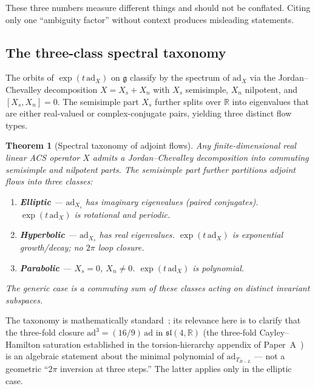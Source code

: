 \documentclass[11pt,a4paper]{article}
\theoremstyle{plain}
\newtheorem{theorem}{Theorem}[section]
\theoremstyle{definition}
\theoremstyle{remark}
\begin{document}
These three numbers measure different things and should not be
conflated.  Citing only one ``ambiguity factor'' without context
produces misleading statements.

\subsection{The three-class spectral taxonomy}
\label{sec:taxonomy}

The orbits of $\exp(t\,\mathrm{ad}_X)$ on $\mathfrak{g}$ classify by
the spectrum of $\mathrm{ad}_X$ via the Jordan--Chevalley decomposition
$X = X_s + X_n$ with $X_s$ semisimple, $X_n$ nilpotent, and
$[X_s, X_n] = 0$.  The semisimple part $X_s$ further splits over
$\mathbb{R}$ into eigenvalues that are either real-valued or
complex-conjugate pairs, yielding three distinct flow types.

\begin{theorem}[Spectral taxonomy of adjoint flows]\label{thm:taxonomy}
Any finite-dimensional real linear ACS operator $X$ admits a
Jordan--Chevalley decomposition into commuting semisimple and
nilpotent parts.  The semisimple part further partitions adjoint
flows into three classes:
\begin{enumerate}[label=(\roman*)]
  \item \textbf{Elliptic} --- $\mathrm{ad}_{X_s}$ has imaginary
    eigenvalues (paired conjugates).  $\exp(t\,\mathrm{ad}_X)$ is
    rotational and periodic.
  \item \textbf{Hyperbolic} --- $\mathrm{ad}_{X_s}$ has real eigenvalues.
    $\exp(t\,\mathrm{ad}_X)$ is exponential growth/decay; no $2\pi$ loop
    closure.
  \item \textbf{Parabolic} --- $X_s = 0$, $X_n \neq 0$.
    $\exp(t\,\mathrm{ad}_X)$ is polynomial.
\end{enumerate}
The generic case is a commuting sum of these classes acting on
distinct invariant subspaces.
\end{theorem}

\noindent
The taxonomy is mathematically standard~\cite{Jacobson1979,Bourbaki1989};
its relevance here is to clarify that the three-fold closure
$\mathrm{ad}^3 = (16/9)\,\mathrm{ad}$ in $\mathfrak{sl}(4,\mathbb{R})$
(the three-fold Cayley--Hamilton saturation established in the torsion-hierarchy
appendix of Paper~A~\cite{Wallace2026a}) is an algebraic statement
about the minimal polynomial of $\mathrm{ad}_{T_{B-L}}$ --- not a
geometric ``$2\pi$ inversion at three steps.''  The latter applies
only in the elliptic case.
\end{document}
